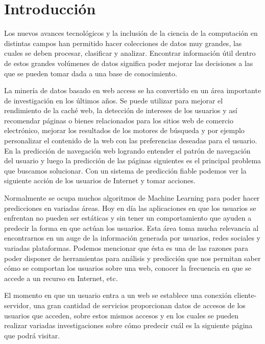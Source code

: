 \chapter[Introducción]{Introducción}
\label{ch:intro}

{
Los nuevos avances tecnológicos y la inclusión de la ciencia de la computación en distintas campos han permitido hacer colecciones de datos muy grandes, las cuales se deben procesar, clasificar y analizar. Encontrar información útil dentro de estos grandes volúmenes de datos significa poder mejorar las decisiones a las que se pueden tomar dada a una base de conocimiento. 

La minería de datos basado en web access se ha convertido en un área importante de investigación en los últimos años. Se puede utilizar para mejorar el rendimiento de la caché web, la detección de intereses de los usuarios y así recomendar páginas o bienes relacionados para los sitios web de comercio electrónico, mejorar los resultados de los motores de búsqueda y por ejemplo personalizar el contenido de la web con las preferencias deseadas para el usuario. En la predicción de navegación web logrando entender el patrón de navegación del usuario y luego la predicción de las páginas siguientes es el principal problema que buscamos solucionar. Con un sistema de predicción fiable podemos ver la siguiente acción de los usuarios de Internet y tomar acciones. 


Normalmente se ocupa muchos algoritmos de Machine Learning para poder hacer predicciones en variadas áreas. Hoy en día las aplicaciones en que los usuarios se enfrentan no pueden ser estáticas y sin tener un comportamiento que ayuden a predecir la forma en que actúan los usuarios. Esta área toma mucha relevancia al encontrarnos en un auge de la información generada por usuarios, redes sociales y variadas plataformas. Podemos mencionar que ésta es una de las razones para poder disponer de herramientas para análisis y predicción que nos permitan saber cómo se comportan los usuarios sobre una web, conocer la frecuencia en que se accede a un recurso en Internet, etc. 

El momento en que un usuario entra a un web se establece una conexión cliente-servidor, una gran cantidad de servicios proporcionan datos de accesos de los usuarios que acceden, sobre estos mismos accesos y en los cuales se pueden realizar variadas investigaciones sobre cómo predecir cuál es la siguiente página que podrá visitar. 


}
